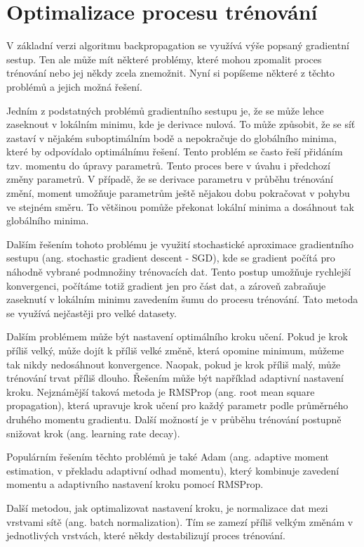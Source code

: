 \section{Optimalizace procesu trénování}

V základní verzi algoritmu backpropagation se využívá výše popsaný gradientní
sestup. Ten ale může mít některé problémy, které mohou zpomalit proces
trénování nebo jej někdy zcela znemožnit. Nyní si popíšeme některé z těchto
problémů a jejich možná řešení.

Jedním z podstatných problémů gradientního sestupu je, že se může lehce
zaseknout v lokálním minimu, kde je derivace nulová. To může způsobit, že se
síť zastaví v nějakém suboptimálním bodě a nepokračuje do globálního minima,
které by odpovídalo optimálnímu řešení. Tento problém se často řeší přidáním
tzv. momentu do úpravy parametrů. Tento proces bere v úvahu i předchozí změny
parametrů. V případě, že se derivace parametru v průběhu trénování změní,
moment umožňuje parametrům ještě nějakou dobu pokračovat v pohybu ve stejném
směru. To většinou pomůže překonat lokální minima a dosáhnout tak globálního
minima.

Dalším řešením tohoto problému je využití stochastické aproximace gradientního
sestupu (ang. stochastic gradient descent - SGD), kde se gradient počítá pro
náhodně vybrané podmnožiny trénovacích dat. Tento postup umožňuje rychlejší
konvergenci, počítáme totiž gradient jen pro část dat, a zároveň zabraňuje
zaseknutí v lokálním minimu zavedením šumu do procesu trénování. Tato metoda se
využívá nejčastěji pro velké datasety.

Dalším problémem může být nastavení optimálního kroku učení. Pokud je krok
příliš velký, může dojít k příliš velké změně, která opomine minimum, můžeme
tak nikdy nedosáhnout konvergence. Naopak, pokud je krok příliš malý, může
trénování trvat příliš dlouho. Řešením může být například adaptivní nastavení
kroku. Nejznámější taková metoda je RMSProp (ang. root mean square
propagation), která upravuje krok učení pro každý parametr podle průměrného
druhého momentu gradientu. Další možností je v průběhu trénování postupně
snižovat krok (ang. learning rate decay).

Populárním řešením těchto problémů je také Adam (ang. adaptive moment
estimation, v překladu adaptivní odhad momentu), který kombinuje zavedení
momentu a adaptivního nastavení kroku pomocí RMSProp.

Další metodou, jak optimalizovat nastavení kroku, je normalizace dat mezi
vrstvami sítě (ang. batch normalization). Tím se zamezí příliš velkým změnám v
jednotlivých vrstvách, které někdy destabilizují proces trénování.

